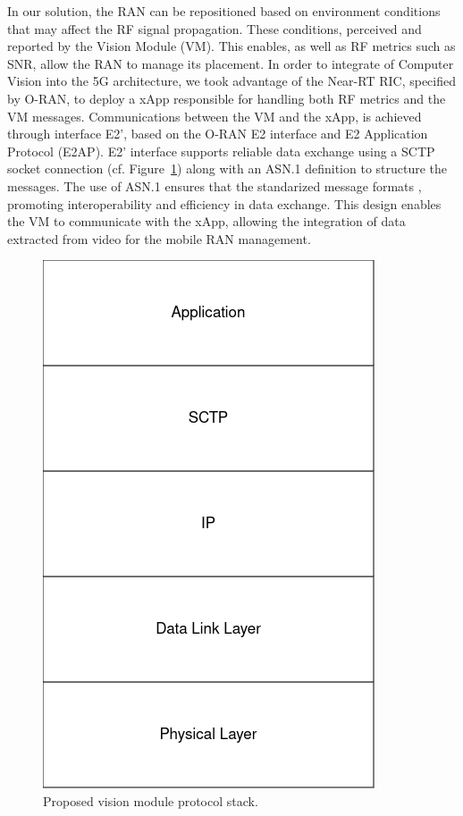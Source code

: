 
In our solution, the RAN can be repositioned based on environment conditions that may affect the RF signal propagation\@.
These conditions, perceived and reported by the Vision Module (VM).
This enables, as well as RF metrics such as SNR, allow the RAN to manage its placement.
In order to integrate of Computer Vision into the 5G architecture, we took advantage of the Near-RT RIC, specified by O-RAN, to deploy a xApp responsible for handling both RF metrics and the VM messages.
Communications between the VM and the xApp, is achieved through interface E2', based on the O-RAN E2 interface and E2 Application Protocol (E2AP).
E2' interface supports reliable data exchange using a SCTP socket connection (cf.
Figure~\ref{fig:stack}) along with an ASN.1 definition to structure the messages.
The use of ASN.1 ensures that the standarized message formats , promoting interoperability and efficiency in data exchange.
This design enables the VM to communicate with the xApp, allowing the integration of data extracted from video for the mobile RAN management.

\begin{figure}[H]
    \centering
    \includegraphics[width=0.25\linewidth]{figures/VisionModule_ProtocolStack.drawio(2)}
    \caption[Proposed Vision Module Protocol Stack]{Proposed vision module protocol stack.}
    \label{fig:stack}
\end{figure}


